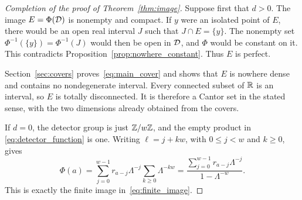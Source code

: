 \begin{proof}[Completion of the proof of Theorem~\ref{thm:image}]
Suppose first that $d>0$. The image $E=\Phi(\mathcal D)$ is nonempty and compact.
If $y$ were an isolated point of $E$, there would be an open real interval
$J$ such that $J\cap E=\{y\}$. The nonempty set
$\Phi^{-1}(\{y\})=\Phi^{-1}(J)$ would then be open in $\mathcal D$, and $\Phi$
would be constant on it. This contradicts
Proposition~\ref{prop:nowhere_constant}. Thus $E$ is perfect.

Section~\ref{sec:covers} proves~\eqref{eq:main_cover} and shows that $E$
is nowhere dense and contains no nondegenerate interval. Every connected
subset of $\mathbb R$ is an interval, so $E$ is totally disconnected. It is
therefore a Cantor set in the stated sense, with the two dimensions
already obtained from the covers.

If $d=0$, the detector group is just $\mathbb Z/w\mathbb Z$, and the empty product in
\eqref{eq:detector_function} is one. Writing $\ell=j+kw$, with
$0\leq j<w$ and $k\geq0$, gives
\[
 \Phi(a)=\sum_{j=0}^{w-1}r_{a-j}\Lambda^{-j}
                   \sum_{k\geq0}\Lambda^{-kw}
   =\frac{\sum_{j=0}^{w-1}r_{a-j}\Lambda^{-j}}{1-\Lambda^{-w}}.
\]
This is exactly the finite image in~\eqref{eq:finite_image}.
\end{proof}

